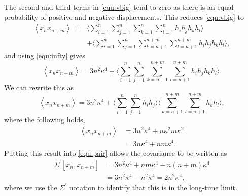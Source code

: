 \documentclass[reprint,superscriptaddress,nobibnotes,amsmath,amssymb,aps,prx,hidelinks]{revtex4-2}
\newcommand{\oMSDn}{\ensuremath{x_n}}
\newcommand{\oMSDm}{\ensuremath{x_{n + m}}}
\begin{document}
The second and third terms in \cref{equ:vbig} tend to zero as there is an equal probability of positive and negative displacements. 
This reduces \cref{equ:vbig} to 
\begin{equation}
    \begin{aligned}
        \left<\oMSDn\oMSDm\right> = & \Bigg\langle \sum_{i=1}^n\sum_{j=1}^n\sum_{k=1}^{n}\sum_{l=1}^{n} h_i h_j h_k h_l \Bigg\rangle \\
        & + \Bigg\langle \sum_{i=1}^n\sum_{j=1}^n\sum_{k=n+1}^{n+m}\sum_{l=n+1}^{n+m} h_i h_j h_k h_l \Bigg\rangle, 
    \end{aligned}
\end{equation}
and using \cref{equ:infty} gives
\begin{equation}
    \left<\oMSDn\oMSDm\right> = 3n^2\kappa^4 + \Bigg\langle \sum_{i=1}^n\sum_{j=1}^n\sum_{k=n+1}^{n+m}\sum_{l=n+1}^{n+m} h_i h_j h_k h_l \Bigg\rangle.
\end{equation}
We can rewrite this as
\begin{equation}
    \left<\oMSDn\oMSDm\right> = 3n^2\kappa^4 + \Bigg\langle \sum_{i=1}^n\sum_{j=1}^n h_i h_j \Bigg\rangle \Bigg\langle \sum_{k=n+1}^{n+m}\sum_{l=n+1}^{n+m} h_k h_l \Bigg\rangle,
\end{equation}
where the following holds,
\begin{equation}
    \begin{aligned}
        \left<\oMSDn\oMSDm\right> &= 3n^2\kappa^4 + n\kappa^2 m\kappa^2 \\
                                  &= 3n\kappa^4 + nm\kappa^4.
    \end{aligned}
\end{equation}
Putting this result into \cref{equ:pair} allows the covariance to be written as
\begin{equation}
    \begin{aligned}
    \Sigma^\prime \left[\oMSDn, \oMSDm \right] &= 3n^2\kappa^4 + nm\kappa^4 - n(n+m)\kappa^4 \\
                                        &= 3n^2\kappa^4 - n^2\kappa^4 = 2n^2\kappa^4,
    \end{aligned}
    \label{equ:cov_der}
\end{equation}
where we use the $\Sigma^\prime$ notation to identify that this is in the long-time limit. 
\end{document}
